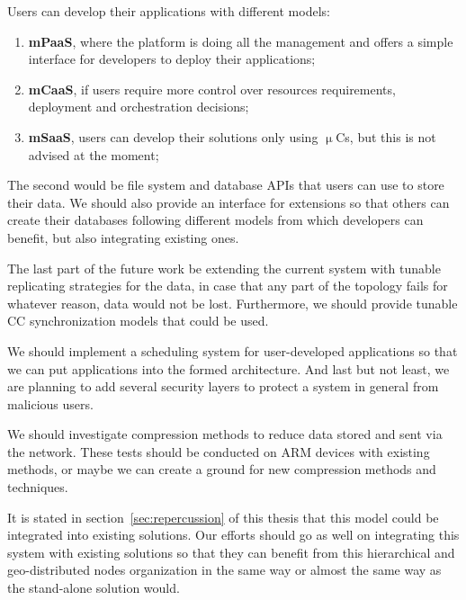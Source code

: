 Users can develop their applications with different models: 

\begin{enumerate}[start=1,label={(\bfseries \arabic*)}]
	\item \textbf{mPaaS}, where the platform is doing all the management and offers a simple interface for developers to deploy their applications;
	\item \textbf{mCaaS}, if users require more control over resources requirements, deployment and orchestration decisions;
	\item \textbf{mSaaS}, users can develop their solutions only using $\upmu$Cs, but this is not advised at the moment;
\end{enumerate}

\noindent
The second would be file system and database APIs that users can use to store their data. We should also provide an interface for extensions so that others can create their databases following different models from which developers can benefit, but also integrating existing ones.

The last part of the future work be extending the current system with tunable replicating strategies for the data, in case that any part of the topology fails for whatever reason, data would not be lost. Furthermore, we should provide tunable CC synchronization models that could be used.

We should implement a scheduling system for user-developed applications so that we can put applications into the formed architecture. And last but not least, we are planning to add several security layers to protect a system in general from malicious users.

We should investigate compression methods to reduce data stored and sent via the network. These tests should be conducted on ARM devices with existing methods, or maybe we can create a ground for new compression methods and techniques.

It is stated in section~\ref{sec:repercussion} of this thesis that this model could be integrated into existing solutions. Our efforts should go as well on integrating this system with existing solutions so that they can benefit from this hierarchical and geo-distributed nodes organization in the same way or almost the same way as the stand-alone solution would.
%
%
